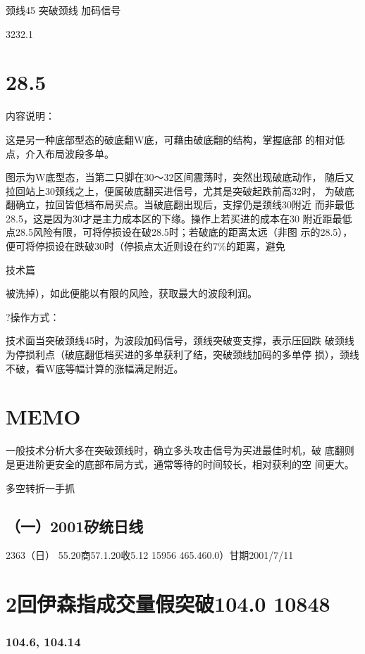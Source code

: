 \documentclass{article}
\begin{document}
颈线45 突破颈线 加码信号

3232.1

\section{28.5}

内容说明：

这是另一种底部型态的破底翻W底，可藉由破底翻的结构，掌握底部 的相对低点，介入布局波段多单。

图示为W底型态，当第二只脚在30～32区间震荡时，突然出现破底动作， 随后又拉回站上30颈线之上，便属破底翻买进信号，尤其是突破起跌前高32时， 为破底翻确立，拉回皆低档布局买点。当破底翻出现后，支撑仍是颈线30附近 而非最低28.5，这是因为30才是主力成本区的下缘。操作上若买进的成本在30 附近距最低点28.5风险有限，可将停损设在破28.5时；若破底的距离太远（非图 示的28.5），便可将停损设在跌破30时（停损点太近则设在约7\%的距离，避免

\clearpage

技术篇

被洗掉），如此便能以有限的风险，获取最大的波段利润。

?操作方式：

技术面当突破颈线45时，为波段加码信号，颈线突破变支撑，表示压回跌 破颈线为停损利点（破底翻低档买进的多单获利了结，突破颈线加码的多单停 损），颈线不破，看W底等幅计算的涨幅满足附近。

\section{MEMO}

一般技术分析大多在突破颈线时，确立多头攻击信号为买进最佳时机，破 底翻则是更进阶更安全的底部布局方式，通常等待的时间较长，相对获利的空 间更大。

\clearpage

多空转折一手抓

\subsection{（一）2001矽统日线}

2363（日） 55.20商57.1.20收5.12 15956 465.460.0）甘期2001/7/11

\section{2回伊森指成交量假突破104.0 10848}

\subsubsection{104.6, 104.14}
\end{document}
